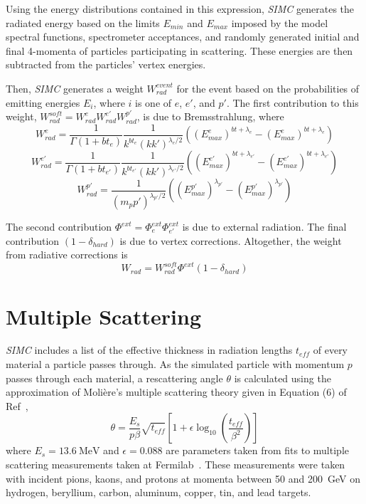 Using the energy distributions contained in this expression,
\textit{SIMC} generates the radiated energy based on the limits
$E_{min}$ and $E_{max}$
imposed by
the model spectral functions,
spectrometer acceptances,
and randomly generated initial and final 4-momenta of particles participating
in scattering.
These energies are then subtracted from the particles' vertex energies.


Then, \textit{SIMC} generates a weight $W^{event}_{rad}$ for the event based on the
probabilities of emitting energies $E_i$, where $i$ is one of $e$, $e'$, and
$p'$.
The first contribution to this weight,
$W^{soft}_{rad}=W^{e}_{rad}W^{e'}_{rad}W^{p'}_{rad}$, is due to Bremsstrahlung,
where
\begin{equation}
    W^{e}_{rad} = \frac{1}{\Gamma(1+bt_{e})} \frac{1}{k^{bt_{e}}(kk')^{\lambda_{e}/2}}
                \left((E^{e}_{max})^{bt+\lambda_{e}}-(E^{e}_{max})^{bt+\lambda_{e}}\right)
\end{equation}
\begin{equation}
    W^{e'}_{rad} = \frac{1}{\Gamma(1+bt_{e'})} \frac{1}{k^{bt_{e'}}(kk')^{\lambda_{e'}/2}}
                \left((E^{e'}_{max})^{bt+\lambda_{e'}}-(E^{e'}_{max})^{bt+\lambda_{e'}}\right)
\end{equation}
\begin{equation}
    W^{p'}_{rad} =  \frac{1}{(m_p p')^{\lambda_{p'}/2}}
                \left((E^{p'}_{max})^{\lambda_{p'}}-(E^{p'}_{max})^{\lambda_{p'}}\right)
\end{equation}

The second contribution $\Phi^{ext}=\Phi^{ext}_{e}\Phi^{ext}_{e'}$
is due to external radiation.
The final contribution $(1-\delta_{hard})$ is due to vertex corrections.
Altogether, the weight from radiative corrections is
\begin{equation}
    W_{rad} = W^{soft}_{rad} \Phi^{ext} (1-\delta_{hard})
\end{equation}


\section{Multiple Scattering}

\textit{SIMC} includes a list of the effective thickness in radiation lengths
$t_{eff}$ of every material a particle passes through.
As the simulated particle with momentum $p$ passes through each material, a
rescattering angle $\theta$ is calculated using the approximation of
Moli\`{e}re's multiple scattering theory given in Equation (6) of
Ref~\cite{Lynch_1991},
\begin{equation}
    \theta = \frac{E_s}{p \beta}
             \sqrt{t_{eff}}
             \left[1 + \epsilon \log_{10}{\left( \frac{t_{eff}}{\beta^2} \right)}\right]
\end{equation}
where $E_s=\SI{13.6}{\mega\electronvolt}$ and $\epsilon=0.088$ are parameters
taken from fits to multiple scattering measurements taken at
Fermilab~\cite{Shen_1979}.
These measurements were taken with incident pions, kaons, and protons at
momenta between 50 and \SI{200}{\giga\electronvolt} on hydrogen, beryllium,
carbon, aluminum, copper, tin, and lead targets.

